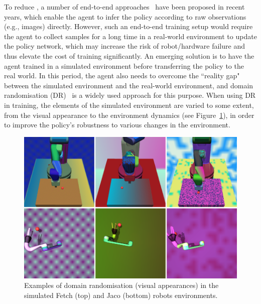 To reduce , a number of end-to-end approaches~\cite{gu2017deep,levine2016end,zhu2017target} have been proposed in recent years, which enable the agent to infer the policy according to raw observations (e.g., images) directly. However, such an end-to-end training setup would require the agent to collect samples for a long time in a real-world environment to update the policy network, which may increase the risk of robot/hardware failure and thus elevate the cost of training significantly. An emerging solution is to have the agent trained in a simulated environment before transferring the policy to the real world. In this period, the agent also needs to overcome the ``reality gap"~\cite{jakobi1995noise} between the simulated environment and the real-world environment, and domain randomisation (DR)~\cite{andrychowicz2018learning,james2017transferring,peng2018sim,sadeghi2017cad2rl,tobin2017domain} is a widely used approach for this purpose. When using DR in training, the elements of the simulated environment are varied to some extent, from the visual appearance to the environment dynamics (see Figure~\ref{fig:dr_example}), in order to improve the policy's robustness to various changes in the environment.
\begin{figure}[h!]
  \centering
  \includegraphics[width=\linewidth]{figures/chapter6/domain_random.png}
  \caption{Examples of domain randomisation (visual appearances) in the simulated Fetch (top) and Jaco (bottom) robots environments.}
  \label{fig:dr_example}
\end{figure}

